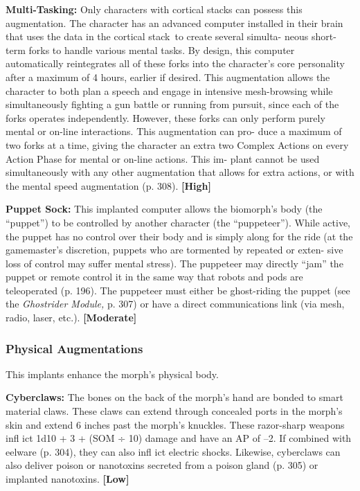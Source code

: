 \textbf{Multi-Tasking:} Only characters with cortical stacks 
can possess this augmentation. The character has an 
advanced computer installed in their brain that uses 
the data in the cortical stack to create several simulta-
neous short-term forks to handle various mental tasks. 
By design, this computer automatically reintegrates 
all of these forks into the character's core personality 
after a maximum of 4 hours, earlier if desired. This 
augmentation allows the character to both plan a 
speech and engage in intensive mesh-browsing while 
simultaneously fighting a gun battle or running from 
pursuit, since each of the forks operates independently. 
However, these forks can only perform purely mental 
or on-line interactions. This augmentation can pro-
duce a maximum of two forks at a time, giving the 
character an extra two Complex Actions on every 
Action Phase for mental or on-line actions. This im-
plant cannot be used simultaneously with any other 
augmentation that allows for extra actions, or with 
the mental speed augmentation (p. 308). \textbf{[High]}

\textbf{Puppet Sock:} This implanted computer allows the 
biomorph's body (the ``puppet'') to be controlled by 
another character (the ``puppeteer''). While active, the 
puppet has no control over their body and is simply 
along for the ride (at the gamemaster's discretion, 
puppets who are tormented by repeated or exten-
sive loss of control may suffer mental stress). The 
puppeteer may directly ``jam'' the puppet or remote 
control it in the same way that robots and pods are 
teleoperated (p. 196). The puppeteer must either be 
ghost-riding the puppet (see the \textit{Ghostrider Module,} p. 
307) or have a direct communications link (via mesh, 
radio, laser, etc.). \textbf{[Moderate]}

\subsubsection{Physical Augmentations}

This implants enhance the morph's physical body.

\textbf{Cyberclaws: }The bones on the back of the morph's 
hand are bonded to smart material claws. These claws 
can extend through concealed ports in the morph's 
skin and extend 6 inches past the morph's knuckles. 
These razor-sharp weapons infl ict 1d10 + 3 + (SOM 
÷ 10) damage and have an AP of –2. If combined 
with eelware (p. 304), they can also infl ict  electric 
shocks. Likewise, cyberclaws can also deliver poison 
or nanotoxins secreted from a poison gland (p. 305) 
or implanted nanotoxins. \textbf{[Low]}

